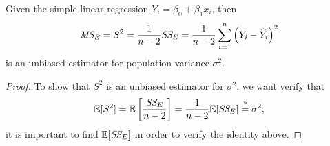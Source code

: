 \begin{theorem}
    Given the simple linear regression $Y_i = \beta_0 + \beta_1 x_i$, then 
    \begin{equation}
        \textit{MS}_{E} = S^2 = \frac{1}{n-2} \textit{SS}_{E} = \frac{1}{n-2} \sum_{i=1}^{n} \left(Y_i - \widehat{Y}_i\right)^2
    \end{equation}
    is an unbiased estimator for population variance $\sigma^2$.
\end{theorem}
\begin{proof}
    To show that $S^2$ is an unbiased estimator for $\sigma^2$, we want verify that
    \[
        \mathbb{E}[S^2] = \mathbb{E} \left[ \frac{\textit{SS}_{E}}{n-2}\right]
        = \frac{1}{n-2} \mathbb{E}[\textit{SS}_{E}] \stackrel{?}{=} \sigma^2,
    \]
    it is important to find $\mathbb{E}[\textit{SS}_{E}]$ in order to verify the identity above.


\end{proof}
